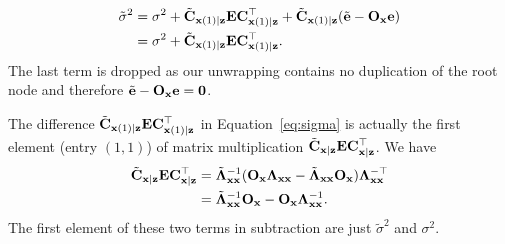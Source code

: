 \begin{equation}
\begin{split}
\label{eq:sigma}
\tilde\sigma^2&=\sigma^2+\tilde{\bf C}_{{\bf x}(1)|{\bf z}}{\bf E}{\bf C}_{{\bf x}(1)|{\bf z}}^\top+\tilde{\bf C}_{{\bf x}(1)|{\bf z}}(\tilde{\bf e}-{\bf O}_{\bf x}{\bf e}) \\
&=\sigma^2+\tilde{\bf C}_{{\bf x}(1)|{\bf z}}{\bf E}{\bf C}_{{\bf x}(1)|{\bf z}}^\top.
\end{split}
\end{equation}
The last term is dropped as our unwrapping contains no duplication of the root node and therefore $\tilde{\bf e}-{\bf O}_{\bf x}{\bf e}=\bf 0$.

The difference $\tilde{\bf C}_{{\bf x}(1)|{\bf z}}{\bf E}{\bf C}_{{\bf x}(1)|{\bf z}}^\top$ in Equation~\eqref{eq:sigma} is actually the first element (entry $(1,1)$) of matrix multiplication $\tilde{\bf C}_{\bf x|z}{\bf E}{\bf C}_{\bf x|z}^\top$. We have
\begin{equation}
\begin{split}
\tilde{\bf C}_{\bf x|z}{\bf E}{\bf C}_{\bf x|z}^\top&=\tilde{\bf \Lambda}_{\bf xx}^{-1}({\bf O}_{\bf x}{\bf \Lambda}_{\bf xx}-\tilde{\bf \Lambda}_{\bf xx}{\bf O}_{\bf x}){\bf \Lambda}_{\bf xx}^{-\top} \\
&=\tilde{\bf \Lambda}_{\bf xx}^{-1}{\bf O}_{\bf x}-{\bf O}_{\bf x}{\bf \Lambda}_{\bf xx}^{-1}. \\
\end{split}
\end{equation}
The first element of these two terms in subtraction are just $\tilde\sigma^2$ and $\sigma^2$.\


